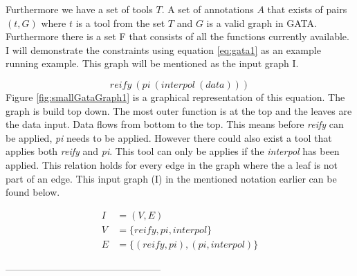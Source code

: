 
Furthermore we have a set of tools $T$. A set of annotations $A$ that exists of pairs $(t, G)$ where $t$ is a tool from the set $T$ and $G$ is a valid graph in GATA. Furthermore there is a set F that consists of all the functions currently available. I will demonstrate the constraints using equation \ref{eq:gata1} as an example running example. This graph will be mentioned as the input graph I.  


\begin{equation}
    reify\ (pi\ (interpol\ (data))) 
\end{equation}
 Figure \ref{fig:smallGataGraph1} is a graphical representation of this equation. The graph is build top down. The most outer function is at the top and the leaves are the data input. Data flows from bottom to the top. This means before \textit{ reify} can be applied, \textit{pi} needs to be applied. However there could also exist a tool that applies both \textit{reify} and \textit{pi}. This tool can only be applies if the \textit{interpol} has been applied. This relation holds for every edge in the graph where the a leaf is not part of an edge. 
 This input graph (I) in the mentioned notation earlier can be found below.
 
 \begin{align*}
     I &= (V,E) \\
     V &= \{reify,pi,interpol\} \\
     E &= \{(reify,pi), (pi,interpol)\}
 \end{align*}

------------------------------------------------